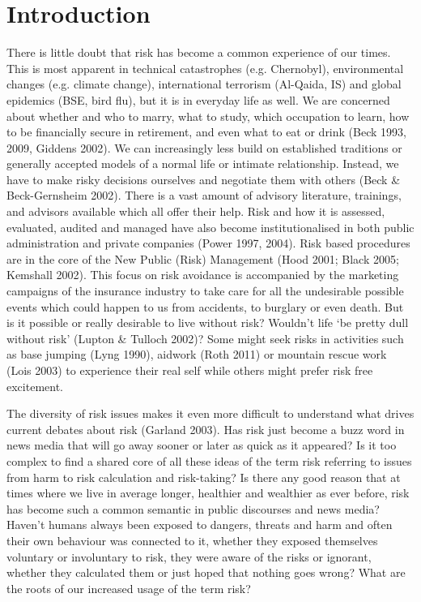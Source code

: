 
\chapter{Introduction} %

There is little doubt that risk has become a common experience of our times. This is most apparent in technical catastrophes (e.g. Chernobyl), environmental changes (e.g. climate change), international terrorism (Al-Qaida, IS) and global epidemics (BSE, bird flu), but it is in everyday life as well. We are concerned about whether and who to marry, what to study, which occupation to learn, how to be financially secure in retirement, and even what to eat or drink (Beck 1993, 2009, Giddens 2002). We can increasingly less build on established traditions or generally accepted models of a normal life or intimate relationship. Instead, we have to make risky decisions ourselves and negotiate them with others (Beck \& Beck-Gernsheim 2002). There is a vast amount of advisory literature, trainings, and advisors available which all offer their help. Risk and how it is assessed, evaluated, audited and managed have also become institutionalised in both public administration and private companies (Power 1997, 2004). Risk based procedures are in the core of the New Public (Risk) Management (Hood 2001; Black 2005; Kemshall 2002). This focus on risk avoidance is accompanied by the marketing campaigns of the insurance industry to take care for all the undesirable possible events which could happen to us from accidents, to burglary or even death. But is it possible or really desirable to live without risk? Wouldn't life `be pretty dull without risk' (Lupton \& Tulloch 2002)? Some might seek risks in activities such as base jumping (Lyng 1990), aidwork (Roth 2011) or mountain rescue work (Lois 2003) to experience their real self while others might prefer risk free excitement. 

The diversity of risk issues makes it even more difficult to understand what drives current debates about risk (Garland 2003). Has risk just become a buzz word in news media that will go away sooner or later as quick as it appeared? Is it too complex to find a shared core of all these ideas of the term risk referring to issues from harm to risk calculation and risk-taking? Is there any good reason that at times where we live in average longer, healthier and wealthier as ever before, risk has become such a common semantic in public discourses and news media? Haven't humans always been exposed to dangers, threats and harm and often their own behaviour was connected to it, whether they exposed themselves voluntary or involuntary to risk, they were aware of the risks or ignorant, whether they calculated them or just hoped that nothing goes wrong? What are the roots of our increased usage of the term risk?

